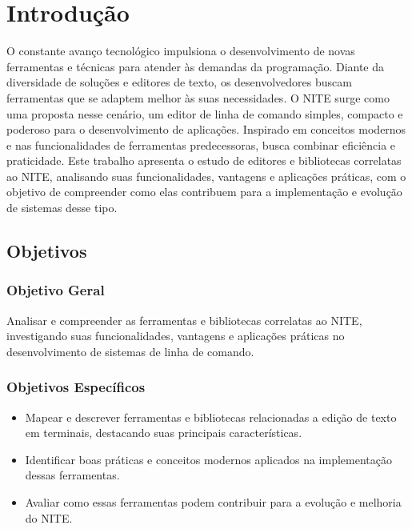 \chapter{Introdução}
\label{cap:01}

O constante avanço tecnológico impulsiona o desenvolvimento de novas ferramentas e técnicas para atender às demandas da programação.
Diante da diversidade de soluções e editores de texto, os desenvolvedores buscam ferramentas que se adaptem melhor às suas necessidades.
O NITE surge como uma proposta nesse cenário, um editor de linha de comando simples, compacto e poderoso para o desenvolvimento de
aplicações. Inspirado em conceitos modernos e nas funcionalidades de ferramentas predecessoras, busca combinar eficiência e praticidade.
Este trabalho apresenta o estudo de editores e bibliotecas correlatas ao NITE, analisando suas funcionalidades, vantagens e aplicações
práticas, com o objetivo de compreender como elas contribuem para a implementação e evolução de sistemas desse tipo.

\section{Objetivos}

\subsection{Objetivo Geral}

Analisar e compreender as ferramentas e bibliotecas correlatas ao NITE, investigando suas funcionalidades, vantagens e aplicações
práticas no desenvolvimento de sistemas de linha de comando.

\subsection{Objetivos Específicos}
\begin{itemize}
    \item Mapear e descrever ferramentas e bibliotecas relacionadas a edição de texto em terminais, destacando suas principais
    características.
    \item Identificar boas práticas e conceitos modernos aplicados na implementação dessas ferramentas.
    \item Avaliar como essas ferramentas podem contribuir para a evolução e melhoria do NITE.
\end{itemize}
